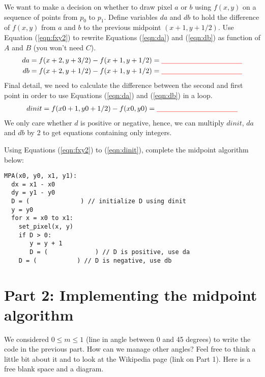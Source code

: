 \documentclass[12pt]{article}
\newcommand{\TODOL}[1]{\textcolor{red}{\underline{\hspace{#1 cm}}}}
\begin{document}
We want to make a decision on whether to draw pixel $a$ or $b$ using $f(x, y)$ on a
sequence of points from $p_0$ to $p_1$. Define variables $da$ and $db$ to hold
the difference of $f(x, y)$ from $a$ and $b$ to the previous midpoint $(x + 1, y
+ 1/2)$. Use Equation (\ref{eqn:fxy2}) to rewrite Equations (\ref{eqn:da}) and
(\ref{eqn:db}) as function of $A$ and $B$ (you won't need $C$).
\begin{align}
da &= f(x + 2, y + 3/2) - f(x + 1, y + 1/2) = \TODOL4 \label{eqn:da}\\
db &= f(x + 2, y + 1/2) - f(x + 1, y + 1/2) = \TODOL4 \label{eqn:db}
\end{align}
Final detail, we need to calculate the difference between the second
and first point in order to use Equations (\ref{eqn:da}) and (\ref{eqn:db}) in a loop.
\begin{align}\label{eqn:dinit}
dinit = f(x0 + 1, y0 + 1/2) - f(x0, y0) = \TODOL4
\end{align}
We only care whether $d$ is positive or negative, hence, we can multiply
$dinit$, $da$ and $db$ by 2 to get equations containing only integers.

Using Equations (\ref{eqn:fxy2}) to (\ref{eqn:dinit}), complete the midpoint
algorithm below:
\begin{lstlisting}
MPA(x0, y0, x1, y1):
  dx = x1 - x0
  dy = y1 - y0
  D = (              ) // initialize D using dinit
  y = y0
  for x = x0 to x1:
    set_pixel(x, y)
    if D > 0:
       y = y + 1
       D = (             ) // D is positive, use da
    D = (           ) // D is negative, use db
\end{lstlisting}

\section*{Part 2: Implementing the midpoint algorithm}

We considered $0 \le m \le 1$ (line in angle between 0 and 45 degrees) to write
the code in the previous part. How can we manage other angles? Feel free to
think a little bit about it and to look at the Wikipedia page (link on Part
1). Here is a free blank space and a diagram.

\begin{center}
\end{center}
\end{document}
